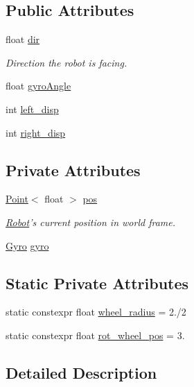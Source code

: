 \subsection*{Public Attributes}
\begin{DoxyCompactItemize}
\item 
float \hyperlink{classOdom_ad2308d2e662650534d2a85aad6c97349}{dir}
\begin{DoxyCompactList}\small\item\em Direction the robot is facing. \end{DoxyCompactList}\item 
float \hyperlink{classOdom_a4c4c2d005150e15fef0db14e923bfca3}{gyro\-Angle}
\item 
int \hyperlink{classOdom_aa29154456ebb189815df2501cc8eb2fd}{left\-\_\-disp}
\item 
int \hyperlink{classOdom_a967a8ce7e6bea53de203e37cf180389a}{right\-\_\-disp}
\end{DoxyCompactItemize}
\subsection*{Private Attributes}
\begin{DoxyCompactItemize}
\item 
\hyperlink{classPoint}{Point}$<$ float $>$ \hyperlink{classOdom_a0e43d9feb433dec91e7a08cee64d732b}{pos}
\begin{DoxyCompactList}\small\item\em \hyperlink{classRobot}{Robot}'s current position in world frame. \end{DoxyCompactList}\item 
\hyperlink{classGyro}{Gyro} \hyperlink{classOdom_a52380c80a1c7072904a766a59e09d3b5}{gyro}
\end{DoxyCompactItemize}
\subsection*{Static Private Attributes}
\begin{DoxyCompactItemize}
\item 
static constexpr float \hyperlink{classOdom_a567d0fcf68e65948aed27f27f35e6973}{wheel\-\_\-radius} = 2./2
\item 
static constexpr float \hyperlink{classOdom_a3d72db210126e10ebcae996e1e707ce5}{rot\-\_\-wheel\-\_\-pos} = 3.
\end{DoxyCompactItemize}


\subsection{Detailed Description}
